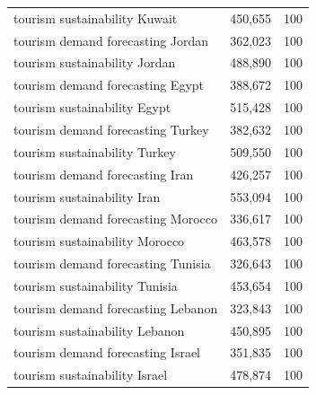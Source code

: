 \begin{longtable}{@{}p{9.2cm}rr@{}}
tourism sustainability Kuwait & 450,655 & 100 \\
tourism demand forecasting Jordan & 362,023 & 100 \\
tourism sustainability Jordan & 488,890 & 100 \\
tourism demand forecasting Egypt & 388,672 & 100 \\
tourism sustainability Egypt & 515,428 & 100 \\
tourism demand forecasting Turkey & 382,632 & 100 \\
tourism sustainability Turkey & 509,550 & 100 \\
tourism demand forecasting Iran & 426,257 & 100 \\
tourism sustainability Iran & 553,094 & 100 \\
tourism demand forecasting Morocco & 336,617 & 100 \\
tourism sustainability Morocco & 463,578 & 100 \\
tourism demand forecasting Tunisia & 326,643 & 100 \\
tourism sustainability Tunisia & 453,654 & 100 \\
tourism demand forecasting Lebanon & 323,843 & 100 \\
tourism sustainability Lebanon & 450,895 & 100 \\
tourism demand forecasting Israel & 351,835 & 100 \\
tourism sustainability Israel & 478,874 & 100 \\
\bottomrule
\end{longtable}
